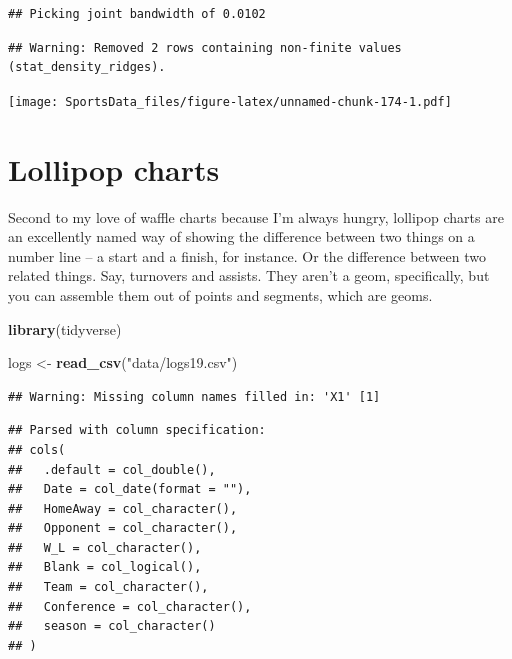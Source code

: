 \documentclass[
]{book}
\newenvironment{Shaded}{\begin{snugshade}}{\end{snugshade}}
\newcommand{\KeywordTok}[1]{\textcolor[rgb]{0.13,0.29,0.53}{\textbf{#1}}}
\newcommand{\NormalTok}[1]{#1}
\newcommand{\StringTok}[1]{\textcolor[rgb]{0.31,0.60,0.02}{#1}}
\begin{document}
\begin{verbatim}
## Picking joint bandwidth of 0.0102
\end{verbatim}

\begin{verbatim}
## Warning: Removed 2 rows containing non-finite values (stat_density_ridges).
\end{verbatim}

\texttt{[image: SportsData\_files/figure-latex/unnamed-chunk-174-1.pdf]}

\hypertarget{lollipop-charts}{%
\chapter{Lollipop charts}\label{lollipop-charts}}

Second to my love of waffle charts because I'm always hungry, lollipop charts are an excellently named way of showing the difference between two things on a number line -- a start and a finish, for instance. Or the difference between two related things. Say, turnovers and assists. They aren't a geom, specifically, but you can assemble them out of points and segments, which are geoms.

\begin{Shaded}
\begin{Highlighting}[]
\KeywordTok{library}\NormalTok{(tidyverse)}
\end{Highlighting}
\end{Shaded}

\begin{Shaded}
\begin{Highlighting}[]
\NormalTok{logs <-}\StringTok{ }\KeywordTok{read_csv}\NormalTok{(}\StringTok{"data/logs19.csv"}\NormalTok{)}
\end{Highlighting}
\end{Shaded}

\begin{verbatim}
## Warning: Missing column names filled in: 'X1' [1]
\end{verbatim}

\begin{verbatim}
## Parsed with column specification:
## cols(
##   .default = col_double(),
##   Date = col_date(format = ""),
##   HomeAway = col_character(),
##   Opponent = col_character(),
##   W_L = col_character(),
##   Blank = col_logical(),
##   Team = col_character(),
##   Conference = col_character(),
##   season = col_character()
## )
\end{verbatim}
\end{document}
